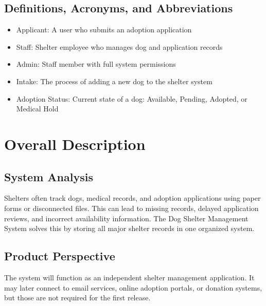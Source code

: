 \documentclass[12pt]{article}
\begin{document}
\subsection{Definitions, Acronyms, and Abbreviations}
\begin{itemize}\item Applicant: A user who submits an adoption application\end{itemize}
\begin{itemize}\item Staff: Shelter employee who manages dog and application records\end{itemize}
\begin{itemize}\item Admin: Staff member with full system permissions\end{itemize}
\begin{itemize}\item Intake: The process of adding a new dog to the shelter system\end{itemize}
\begin{itemize}\item Adoption Status: Current state of a dog: Available, Pending, Adopted, or Medical Hold\end{itemize}
\section{Overall Description}
\subsection{System Analysis}
Shelters often track dogs, medical records, and adoption applications using paper forms or disconnected files. This can lead to missing records, delayed application reviews, and incorrect availability information. The Dog Shelter Management System solves this by storing all major shelter records in one organized system.
\subsection{Product Perspective}
The system will function as an independent shelter management application. It may later connect to email services, online adoption portals, or donation systems, but those are not required for the first release.
\end{document}
